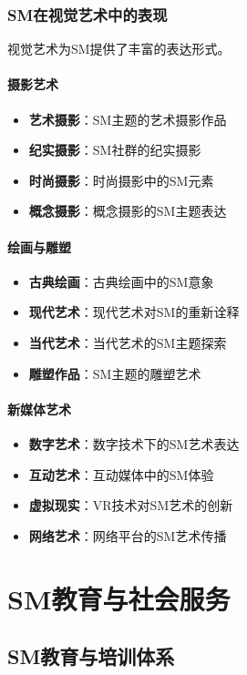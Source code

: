 \documentclass[12pt,UTF8]{ctexbook}
\begin{document}
\section{SM在视觉艺术中的表现}
视觉艺术为SM提供了丰富的表达形式。

\subsection{摄影艺术}
\begin{itemize}[leftmargin=2cm]
	\item \textbf{艺术摄影}：SM主题的艺术摄影作品
	\item \textbf{纪实摄影}：SM社群的纪实摄影
	\item \textbf{时尚摄影}：时尚摄影中的SM元素
	\item \textbf{概念摄影}：概念摄影的SM主题表达
\end{itemize}

\subsection{绘画与雕塑}
\begin{itemize}[leftmargin=2cm]
	\item \textbf{古典绘画}：古典绘画中的SM意象
	\item \textbf{现代艺术}：现代艺术对SM的重新诠释
	\item \textbf{当代艺术}：当代艺术的SM主题探索
	\item \textbf{雕塑作品}：SM主题的雕塑艺术
\end{itemize}

\subsection{新媒体艺术}
\begin{itemize}[leftmargin=2cm]
	\item \textbf{数字艺术}：数字技术下的SM艺术表达
	\item \textbf{互动艺术}：互动媒体中的SM体验
	\item \textbf{虚拟现实}：VR技术对SM艺术的创新
	\item \textbf{网络艺术}：网络平台的SM艺术传播
\end{itemize}

\part{SM教育与社会服务}

\chapter{SM教育与培训体系}
\end{document}
